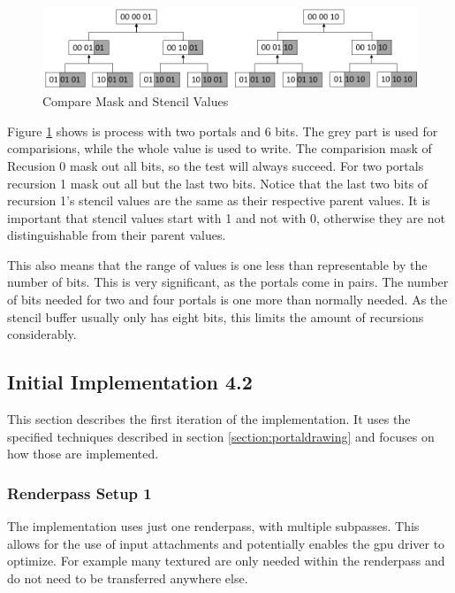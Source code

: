 \begin{figure}[h]
	\includegraphics[width=\linewidth]{images/stencilvalues2.png}
	\caption{Compare Mask and Stencil Values}
	\label{fig:stencilvalues}
\end{figure}

Figure \ref{fig:stencilvalues} shows is process with two portals and 6 bits. The grey part is used for comparisions, while the whole value is used to write. The comparision mask of Recusion 0 mask out all bits, so the test will always succeed. For two portals recursion 1 mask out all but the last two bits. Notice that the last two bits of  recursion 1's stencil values are the same as their respective parent values. It is important that stencil values start with 1 and not with 0, otherwise they are not distinguishable from their parent values.

This also means that the range of values is one less than representable by the number of bits. This is very significant, as the portals come in pairs. The number of bits needed for two and four portals is one more than normally needed. As the stencil buffer usually only has eight bits, this limits the amount of recursions considerably.



\subsection{Initial Implementation 4.2}
\label{section:intialimplementation}
This section describes the first iteration of the implementation. It uses the specified techniques described in section \ref{section:portaldrawing} and focuses on how those are implemented.


\subsubsection{Renderpass Setup 1}
\label{section:renderpasssetup}

The implementation uses just one renderpass, with multiple subpasses. This allows for the use of input attachments and potentially enables the \gls{gpu} driver to optimize. For example many textured are only needed within the renderpass and do not need to be transferred anywhere else.

